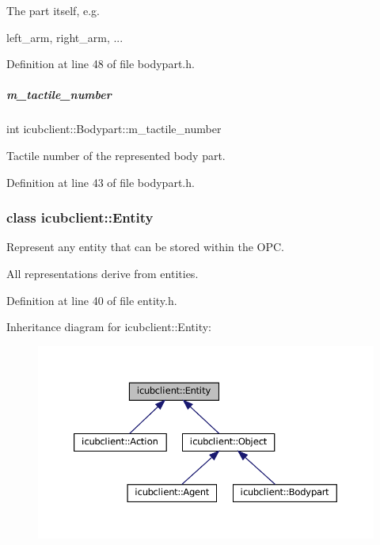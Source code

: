 The part itself, e.\+g. 

left\+\_\+arm, right\+\_\+arm, ... 

Definition at line 48 of file bodypart.\+h.

\mbox{\label{group__icubclient__representations_a2551839d7a05aad0ed6cb5c4bca69b7a}} 
\subparagraph{\texorpdfstring{m\+\_\+tactile\+\_\+number}{m\_tactile\_number}}
{\footnotesize\ttfamily int icubclient\+::\+Bodypart\+::m\+\_\+tactile\+\_\+number}



Tactile number of the represented body part. 



Definition at line 43 of file bodypart.\+h.

\label{classicubclient_1_1Entity}
\subsubsection{class icubclient\+:\+:Entity}
Represent any entity that can be stored within the O\+PC. 

All representations derive from entities. 

Definition at line 40 of file entity.\+h.



Inheritance diagram for icubclient\+:\+:Entity\+:
\nopagebreak
\begin{figure}[H]
\begin{center}
\leavevmode
\includegraphics[width=350pt]{classicubclient_1_1Entity__inherit__graph}
\end{center}
\end{figure}
